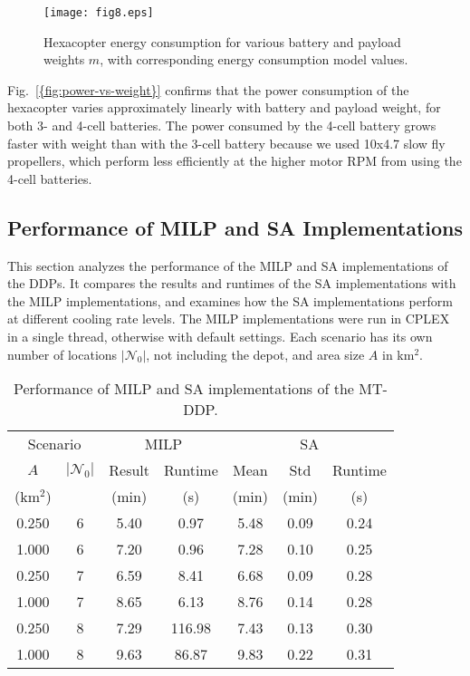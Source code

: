 \documentclass[journal]{IEEEtran}
\begin{document}
\begin{figure}[t]
\centering
\texttt{[image: fig8.eps]}
\caption{Hexacopter energy consumption for various battery and payload weights ${\ensuremath{m}}$, with corresponding energy consumption model values.}
\label{fig:power-vs-weight}
\end{figure}

{Fig.~\ref{{fig:power-vs-weight}}} confirms that the power consumption of the hexacopter varies approximately linearly with battery and payload weight, for both 3- and 4-cell batteries. The power consumed by the 4-cell battery grows faster with weight than with the 3-cell battery because we used 10x4.7 slow fly propellers, which perform less efficiently at the higher motor RPM from using the 4-cell batteries.

\subsection{Performance of MILP and SA Implementations}
\label{ssec:mip-sa-performance}

This section analyzes the performance of the MILP and SA implementations of the DDPs. It compares the results and runtimes of the SA implementations with the MILP implementations, and examines how the SA implementations perform at different cooling rate levels. The MILP implementations were run in CPLEX in a single thread, otherwise with default settings. Each scenario has its own number of locations $|{\ensuremath{{\ensuremath{\mathcal{N}}}_{0}}}{}|$, not including the depot, and area size ${\ensuremath{A}}$ in km$^2$.

\begin{table}[t!]        
\caption{Performance of MILP and SA implementations of the MT-DDP.}
\label{table:mip-sa-mt-dpp}                                               
\centering                                                         
\begin{tabular}{|c c|c c|c c c|}                                        
\hline                                 
\multicolumn{2}{|c|}{Scenario} & \multicolumn{2}{c|}{MILP} & \multicolumn{3}{c|}{SA} \\
${\ensuremath{A}}$ & $|{\ensuremath{{\ensuremath{\mathcal{N}}}_{0}}}{}|$ & Result & Runtime & Mean & Std & Runtime \\
(km$^2$) &  & (min) & (s) & (min) & (min) & (s) \\
\hline
0.250 & 6 & 5.40 & 0.97 & 5.48 & 0.09 & 0.24 \\  
1.000 & 6 & 7.20 & 0.96 & 7.28 & 0.10 & 0.25 \\  
0.250 & 7 & 6.59 & 8.41 & 6.68 & 0.09 & 0.28 \\  
1.000 & 7 & 8.65 & 6.13 & 8.76 & 0.14 & 0.28 \\  
0.250 & 8 & 7.29 & 116.98 & 7.43 & 0.13 & 0.30 \\
1.000 & 8 & 9.63 & 86.87 & 9.83 & 0.22 & 0.31 \\
\hline
\end{tabular}                                                                                                        
\end{table}
\end{document}
